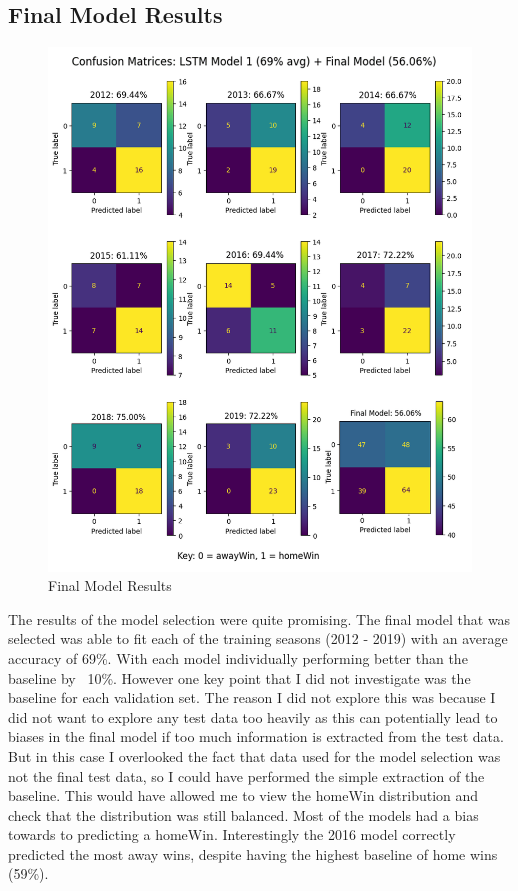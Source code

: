 \documentclass{imc-inf}
\begin{document}
	\subsection{Final Model Results}
	\begin{figure}
		\caption{Final Model Results}
		\includegraphics[width=15cm]{media/final_results.png}
	\end{figure}
	The results of the model selection were quite promising. The final model that was selected was able to fit each of the training seasons (2012 - 2019) with an average accuracy of 69\%. With each model individually performing better than the baseline by ~10\%. However one key point that I did not investigate was the baseline for each validation set. The reason I did not explore this was because I did not want to explore any test data too heavily as this can potentially lead to biases in the final model if too much information is extracted from the test data. But in this case I overlooked the fact that data used for the model selection was not the final test data, so I could have performed the simple extraction of the baseline. This would have allowed me to view the homeWin distribution and check that the distribution was still balanced. Most of the models had a bias towards to predicting a homeWin. Interestingly the 2016 model correctly predicted the most away wins, despite having the highest baseline of home wins (59\%).
	
\end{document}

